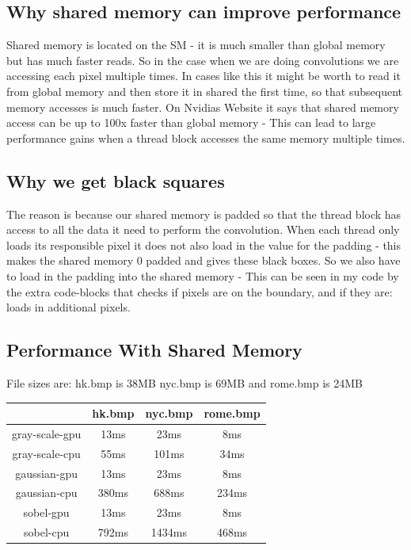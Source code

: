 \documentclass{article}
\begin{document}
\subsection{Why shared memory can improve performance}%
\label{sub:why_shared_memory_can_improve_performance}

Shared memory is located on the SM - it is much smaller than global memory but has much faster reads. So in the case when we are doing convolutions we are accessing each
pixel multiple times. In cases like this it might be worth to read it from global memory and then store it in shared the first time, so that subsequent memory accesses is much faster. On 
Nvidias Website it says that shared memory access can be up to 100x faster than global memory - This can lead to large performance gains when a thread block accesses the same memory multiple times.

\subsection{Why we get black squares}%

The reason is because our shared memory is padded so that the thread block has access to all the data it need to perform the convolution. When each thread only loads its responsible pixel it does not also load in 
the value for the padding - this makes the shared memory 0 padded and gives these black boxes. So we also have to load in the padding into the shared memory - This can be seen in my code by the extra code-blocks that
checks if pixels are on the boundary, and if they are: loads in additional pixels.

\subsection{Performance With Shared Memory}%
\label{sub:}

File sizes are: hk.bmp is 38MB nyc.bmp is 69MB and rome.bmp is 24MB


\begin{center}
  \begin{tabular}{ | c | c | c | c | }
    \hline
    & hk.bmp & nyc.bmp & rome.bmp\\ \hline
    gray-scale-gpu & 13ms & 23ms & 8ms\\ \hline
    gray-scale-cpu & 55ms & 101ms & 34ms\\ \hline
    gaussian-gpu & 13ms & 23ms & 8ms\\ \hline
    gaussian-cpu & 380ms & 688ms & 234ms \\ \hline
    sobel-gpu & 13ms & 23ms & 8ms \\  \hline
    sobel-cpu & 792ms & 1434ms & 468ms \\  \hline
    \hline
  \end{tabular}
\end{center}
\end{document}
